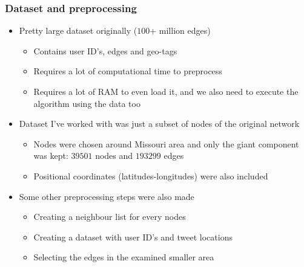 \begin{frame}
\frametitle{Dataset and preprocessing}

\begin{itemize}
	\item<1-> Pretty large dataset originally ($100$+ million edges)
	\begin{itemize}
		\item<1-> Contains user ID's, edges and geo-tags
		\item<1-> Requires a lot of computational time to preprocess
		\item<1-> Requires a lot of RAM to even load it, and we also need to execute the algorithm using the data too
	\end{itemize}
	\item<2-> Dataset I've worked with was just a subset of nodes of the original network
	\begin{itemize}
		\item<2-> Nodes were chosen around Missouri area and only the giant component was kept: $39501$ nodes and $193299$ edges
		\item<2-> Positional coordinates (latitudes-longitudes) were also included
	\end{itemize}
	\item<3-> Some other preprocessing steps were also made
	\begin{itemize}
		\item<3-> Creating a neighbour list for every nodes
		\item<3-> Creating a dataset with user ID's and tweet locations
		\item<3-> Selecting the edges in the examined smaller area
	\end{itemize}
\end{itemize}

\end{frame}